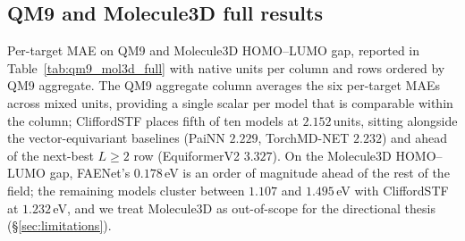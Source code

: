 \subsection{QM9 and Molecule3D full results}\label{supp:qm9_full}

Per-target MAE on QM9 and Molecule3D HOMO--LUMO gap, reported in Table~\ref{tab:qm9_mol3d_full} with native units per column and rows ordered by QM9 aggregate. The QM9 aggregate column averages the six per-target MAEs across mixed units, providing a single scalar per model that is comparable within the column; CliffordSTF places fifth of ten models at $2.152$\,units, sitting alongside the vector-equivariant baselines (PaiNN $2.229$, TorchMD-NET $2.232$) and ahead of the next-best $L\!\geq\!2$ row (EquiformerV2 $3.327$). On the Molecule3D HOMO--LUMO gap, FAENet's $0.178$\,eV is an order of magnitude ahead of the rest of the field; the remaining models cluster between $1.107$ and $1.495$\,eV with CliffordSTF at $1.232$\,eV, and we treat Molecule3D as out-of-scope for the directional thesis (\S\ref{sec:limitations}).

